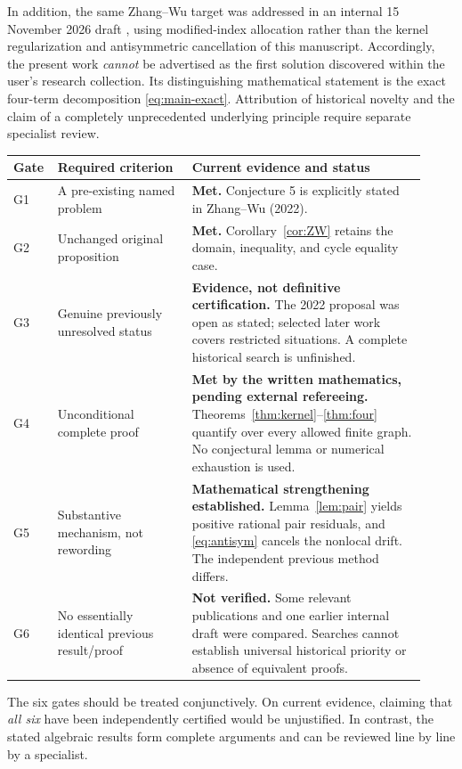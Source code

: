 \documentclass[11pt,a4paper]{article}
\theoremstyle{remark}
\begin{document}
In addition, the same Zhang--Wu target was addressed in an internal 15 November 2026 draft \cite{Earlier}, using modified-index allocation rather than the kernel regularization and antisymmetric cancellation of this manuscript. Accordingly, the present work \emph{cannot} be advertised as the first solution discovered within the user's research collection. Its distinguishing mathematical statement is the exact four-term decomposition \eqref{eq:main-exact}. Attribution of historical novelty and the claim of a completely unprecedented underlying principle require separate specialist review.

\medskip
\small
\begin{longtable}{@{}p{0.07\linewidth}p{0.31\linewidth}p{0.54\linewidth}@{}}
\toprule
Gate & Required criterion & Current evidence and status \\\midrule
G1 & A pre-existing named problem & \textbf{Met.} Conjecture 5 is explicitly stated in Zhang--Wu (2022). \\
G2 & Unchanged original proposition & \textbf{Met.} Corollary~\ref{cor:ZW} retains the domain, inequality, and cycle equality case. \\
G3 & Genuine previously unresolved status & \textbf{Evidence, not definitive certification.} The 2022 proposal was open as stated; selected later work covers restricted situations. A complete historical search is unfinished. \\
G4 & Unconditional complete proof & \textbf{Met by the written mathematics, pending external refereeing.} Theorems~\ref{thm:kernel}--\ref{thm:four} quantify over every allowed finite graph. No conjectural lemma or numerical exhaustion is used. \\
G5 & Substantive mechanism, not rewording & \textbf{Mathematical strengthening established.} Lemma~\ref{lem:pair} yields positive rational pair residuals, and \eqref{eq:antisym} cancels the nonlocal drift. The independent previous method differs. \\
G6 & No essentially identical previous result/proof & \textbf{Not verified.} Some relevant publications and one earlier internal draft were compared. Searches cannot establish universal historical priority or absence of equivalent proofs. \\
\bottomrule
\end{longtable}
\normalsize

The six gates should be treated conjunctively. On current evidence, claiming that \emph{all six} have been independently certified would be unjustified. In contrast, the stated algebraic results form complete arguments and can be reviewed line by line by a specialist.
\end{document}
